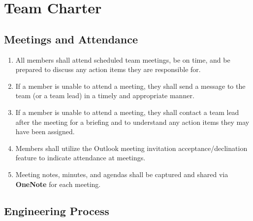 \chapter{Team Charter}\label{cp:team_charter}

\section{Meetings and Attendance}

\begin{enumerate}
    \item All members shall attend scheduled team meetings, be on time, and be prepared to discuss any action items they are responsible for.
    \item If a member is unable to attend a meeting, they shall send a message to the team (or a team lead) in a timely and appropriate manner.
    \item If a member is unable to attend a meeting, they shall contact a team lead after the meeting for a briefing and to understand any action items they may have been assigned.
    \item Members shall utilize the Outlook meeting invitation acceptance/declination feature to indicate attendance at meetings.
    \item Meeting notes, minutes, and agendas shall be captured and shared via \textbf{OneNote} for each meeting.
\end{enumerate}

\section {Engineering Process}

